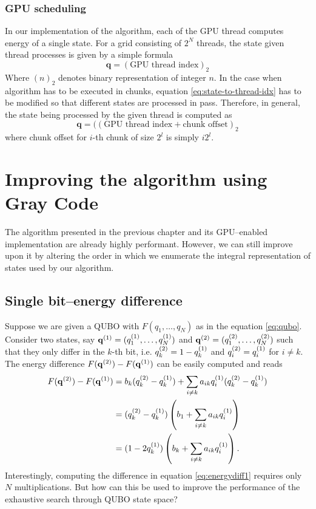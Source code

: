 \subsubsection{GPU scheduling}
In our implementation of the algorithm, each of the GPU thread computes energy of a single state. For a grid consisting of $2^N$ threads, the state given thread processes is given by a simple formula
\begin{equation}
\label{eq:state-to-thread-idx}
    \mathbf{q} = (\mbox{GPU thread index})_2
\end{equation}
Where $(n)_2$ denotes binary representation of integer $n$. In the case when algorithm has to be executed in chunks, equation \eqref{eq:state-to-thread-idx} has to be modified so that different states are processed in pass. Therefore, in general, the state being processed by the given thread is computed as
\begin{equation}
\mathbf{q} = ((\mbox{GPU thread index} + \mbox{chunk offset})_2
\end{equation}
where chunk offset for $i$-th chunk of size $2^l$ is simply $i2^l$.

\section{Improving the algorithm using Gray Code}

The algorithm presented in the previous chapter and its GPU--enabled implementation are already highly performant. However, we can still improve upon it by altering the order in which we enumerate the integral representation of states used by our algorithm.

\subsection{Single bit--energy difference}
Suppose we are given a QUBO with $F(q_{1},\ldots,q_{N})$ as in the equation \ref{eq:qubo}. Consider two states, say $\mathbf{q}^{(1)} = (q^{(1)}_{1},\ldots,q^{(1)}_{N})$ and $\mathbf{q}^{(2)}=(q^{(2)}_{1},\ldots,q^{(2)}_{N})$ such that they only differ in the $k$-th bit, i.e. $q^{(2)}_{k}=1-q^{(1)}_{k}$ and $q^{(2)}_{i}=q^{(1)}_{i}$ for $i \ne k$.
The energy difference $F(\mathbf{q}^{(2)})-F(\mathbf{q}^{(1)})$ can be easily computed and reads
\begin{align}
\begin{split}
  \label{eq:energydiff1}
  F(\mathbf{q}^{(2)})-F(\mathbf{q}^{(1)}) &= b_{k}(q^{(2)}_{k}-q^{(1)}_{k}) + \sum_{i\ne k}a_{ik}q^{(1)}_{i}(q^{(2)}_{k} - q^{(1)}_{k}) \\
                      &= (q^{(2)}_{k}-q^{(1)}_{k}) \left(b_{1} + \sum_{i \ne k}a_{ik}q^{(1)}_{i}\right) \\
  & = (1-2q^{(1)}_{k}) \left(b_{k} + \sum_{i \ne k}a_{ik}q^{(1)}_{i}\right).
\end{split}
\end{align}
Interestingly, computing the difference in equation \eqref{eq:energydiff1} requires only $N$ multiplications.   But how can this be used to improve the performance of the exhaustive search through QUBO state space?

